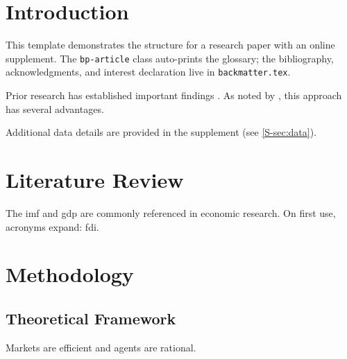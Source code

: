 \documentclass[12pt, draft, colorlinks, doublespace]{bp-article}
\begin{document}



\section{Introduction} \label{sec:intro}

This template demonstrates the structure for a research paper with an online supplement.
The \texttt{bp-article} class auto-prints the glossary; the bibliography, acknowledgments, and interest declaration live in \texttt{backmatter.tex}.

Prior research has established important findings \citep{exampleAuthor2024}.
As noted by \citet{exampleAuthor2024}, this approach has several advantages.

Additional data details are provided in the supplement (see \cref{S-sec:data}).


\section{Literature Review} \label{sec:literature}

The \gls{imf} and \gls{gdp} are commonly referenced in economic research.
On first use, acronyms expand: \acrfull{fdi}.


\section{Methodology} \label{sec:methodology}

\subsection{Theoretical Framework} \label{subsec:theory}

\begin{assumption} \label{ass:example}
Markets are efficient and agents are rational.
\end{assumption}
\end{document}
